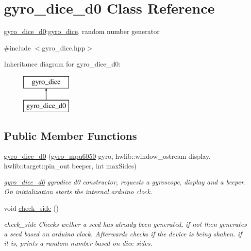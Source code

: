 \hypertarget{classgyro__dice__d0}{}\section{gyro\+\_\+dice\+\_\+d0 Class Reference}
\label{classgyro__dice__d0}


\hyperlink{classgyro__dice__d0}{gyro\+\_\+dice\+\_\+d0}\+:\hyperlink{classgyro__dice}{gyro\+\_\+dice}, random number generator  




{\ttfamily \#include $<$gyro\+\_\+dice.\+hpp$>$}

Inheritance diagram for gyro\+\_\+dice\+\_\+d0\+:\begin{figure}[H]
\begin{center}
\leavevmode
\includegraphics[height=2.000000cm]{classgyro__dice__d0}
\end{center}
\end{figure}
\subsection*{Public Member Functions}
\begin{DoxyCompactItemize}
\item 
\mbox{\label{classgyro__dice__d0_a5ff76c0046425a946609726a8896b94c}} 
\hyperlink{classgyro__dice__d0_a5ff76c0046425a946609726a8896b94c}{gyro\+\_\+dice\+\_\+d0} (\hyperlink{classgyro__mpu6050}{gyro\+\_\+mpu6050} gyro, hwlib\+::window\+\_\+ostream display, hwlib\+::target\+::pin\+\_\+out beeper, int max\+Sides)
\begin{DoxyCompactList}\small\item\em \hyperlink{classgyro__dice__d0}{gyro\+\_\+dice\+\_\+d0} gyrodice d0 constructor, requests a gyroscope, display and a beeper. On initialization starts the internal arduino clock. \end{DoxyCompactList}\item 
\mbox{\label{classgyro__dice__d0_ad5b0b46a729eb22c55fada78c2ebec24}} 
void \hyperlink{classgyro__dice__d0_ad5b0b46a729eb22c55fada78c2ebec24}{check\+\_\+side} ()
\begin{DoxyCompactList}\small\item\em check\+\_\+side Checks wether a seed has already been generated, if not then generates a seed based on arduino clock. Afterwards checks if the device is being shaken. if it is, prints a random number based on dice sides. \end{DoxyCompactList}\end{DoxyCompactItemize}


